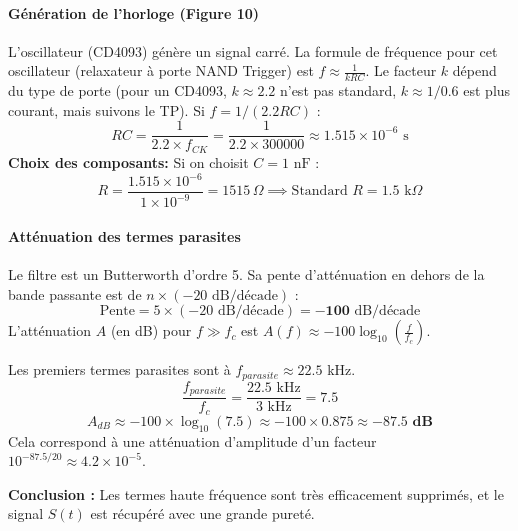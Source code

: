 \documentclass[11pt,a4paper]{article}
\begin{document}
\paragraph{Génération de l'horloge (Figure 10)}
L'oscillateur (CD4093) génère un signal carré. La formule de fréquence pour cet oscillateur (relaxateur à porte NAND Trigger) est $f \approx \frac{1}{k RC}$. Le facteur $k$ dépend du type de porte (pour un CD4093, $k \approx 2.2$ n'est pas standard, $k \approx 1/0.6$ est plus courant, mais suivons le TP). Si $f = 1/(2.2 RC)$ :
\begin{equation}
RC = \frac{1}{2.2 \times f_{CK}} = \frac{1}{2.2 \times 300000} \approx 1.515 \times 10^{-6} \text{ s}
\end{equation}
\textbf{Choix des composants:}
Si on choisit $\boxed{C = 1 \text{ nF}}$ :
\begin{equation}
R = \frac{1.515 \times 10^{-6}}{1 \times 10^{-9}} = 1515 \, \Omega \implies \text{Standard } \boxed{R = 1.5 \text{ k}\Omega}
\end{equation}

\paragraph{Atténuation des termes parasites}
Le filtre est un Butterworth d'ordre 5.
Sa pente d'atténuation en dehors de la bande passante est de $n \times (-20 \text{ dB/décade})$ :
\begin{equation}
\text{Pente} = 5 \times (-20 \text{ dB/décade}) = \mathbf{-100} \text{ dB/décade}
\end{equation}
L'atténuation $A$ (en dB) pour $f \gg f_c$ est $A(f) \approx -100 \log_{10}\left(\frac{f}{f_c}\right)$.

Les premiers termes parasites sont à $f_{parasite} \approx 22.5$ kHz.
\begin{equation}
\frac{f_{parasite}}{f_c} = \frac{22.5 \text{ kHz}}{3 \text{ kHz}} = 7.5
\end{equation}
\begin{equation}
A_{dB} \approx -100 \times \log_{10}(7.5) \approx -100 \times 0.875 \approx \mathbf{-87.5 \text{ dB}}
\end{equation}
Cela correspond à une atténuation d'amplitude d'un facteur $10^{-87.5/20} \approx 4.2 \times 10^{-5}$.


\textbf{Conclusion :} Les termes haute fréquence sont très efficacement supprimés, et le signal $S(t)$ est récupéré avec une grande pureté.

\vspace{1cm}
\end{document}
